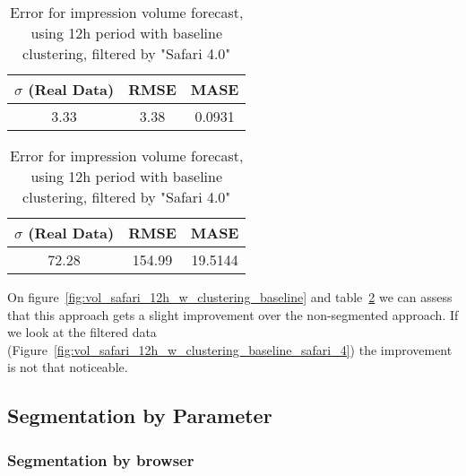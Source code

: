 \begin{table}[!ht]
\centering
\footnotesize
\begin{minipage}[t]{0.45\linewidth}
\centering
\footnotesize
\begin{tabular}{ccc}
 $\sigma$ (Real Data) & RMSE & MASE   \\ \hline
3.33 & 3.38 & 0.0931 \\
\end{tabular}

\vspace{0.5cm}

\caption[Volume
impression forecast error, safari, baseline clustering]{Error for impression volume
forecast, using 12h period with baseline clustering}
\label{tab:err_forecast_12_safari_w_clustering_datastream_14}
\end{minipage}
\quad
\begin{minipage}[t]{0.45\linewidth}
\centering
\footnotesize
\begin{tabular}{ccc}
 $\sigma$ (Real Data) & RMSE & MASE   \\ \hline
72.28 & 154.99 & 19.5144 \\
\end{tabular}

\vspace{0.5cm}

\caption[Volume
impression forecast error, safari, baseline clustering, filtered]{Error for impression volume
forecast, using 12h period with baseline clustering, filtered by "Safari 4.0"}
\label{tab:err_forecast_12_safari_w_clustering_baseline_safari}
\end{minipage}

\end{table}

On figure~\ref{fig:vol_safari_12h_w_clustering_baseline} and table~\ref{tab:err_forecast_12_safari_w_clustering_baseline_safari}
we can assess that this approach gets a slight improvement over the
non-segmented approach. If we look at the filtered data
(Figure~\ref{fig:vol_safari_12h_w_clustering_baseline_safari_4}) the improvement
is not that noticeable.


\subsection*{Segmentation by Parameter}

\subsubsection*{Segmentation by browser}

